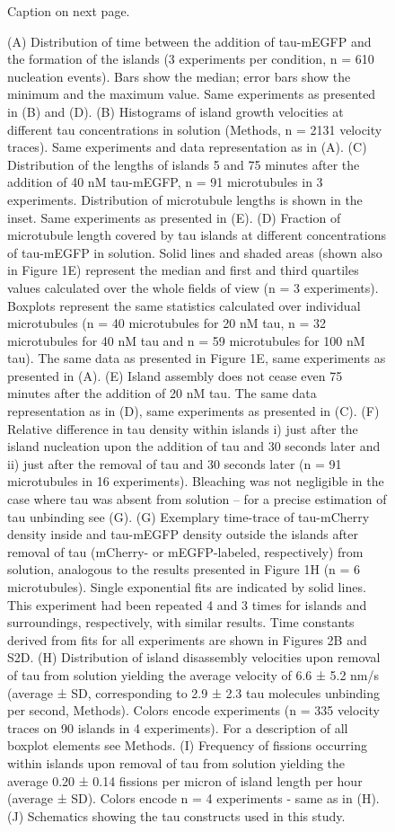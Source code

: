 \begin{figure}[h!tb]
\centering
\caption[Supplementary figure for: Tau on microtubules separates into two kinetically distinct phases.]{
Caption on next page.
	}\label{tau_s1}
\end{figure}
\begin{figure}[t]
  \caption{
 (A) Distribution of time between the addition of tau-mEGFP and the formation of the islands (3 experiments per condition, n = 610 nucleation events). Bars show the median; error bars show the minimum and the maximum value. Same experiments as presented in (B) and (D). (B) Histograms of island growth velocities at different tau concentrations in solution (Methods, n = 2131 velocity traces). Same experiments and data representation as in (A). (C) Distribution of the lengths of islands 5 and 75 minutes after the addition of 40 nM tau-mEGFP, n = 91 microtubules in 3 experiments. Distribution of microtubule lengths is shown in the inset. Same experiments as presented in (E). (D) Fraction of microtubule length covered by tau islands at different concentrations of tau-mEGFP in solution. Solid lines and shaded areas (shown also in Figure 1E) represent the median and first and third quartiles values calculated over the whole fields of view (n = 3 experiments). Boxplots represent the same statistics calculated over individual microtubules (n = 40 microtubules for 20 nM tau, n = 32 microtubules for 40 nM tau and n = 59 microtubules for 100 nM tau). The same data as presented in Figure 1E, same experiments as presented in (A). (E) Island assembly does not cease even 75 minutes after the addition of 20 nM tau. The same data representation as in (D), same experiments as presented in (C). (F) Relative difference in tau density within islands i) just after the island nucleation upon the addition of tau and 30 seconds later and ii) just after the removal of tau and 30 seconds later (n = 91 microtubules in 16 experiments). Bleaching was not negligible in the case where tau was absent from solution – for a precise estimation of tau unbinding see (G). (G) Exemplary time-trace of tau-mCherry density inside and tau-mEGFP density outside the islands after removal of tau (mCherry- or mEGFP-labeled, respectively) from solution, analogous to the results presented in Figure 1H (n = 6 microtubules). Single exponential fits are indicated by solid lines. This experiment had been repeated 4 and 3 times for islands and surroundings, respectively, with similar results. Time constants derived from fits for all experiments are shown in Figures 2B and S2D. (H) Distribution of island disassembly velocities upon removal of tau from solution yielding the average velocity of 6.6 ± 5.2 nm/s (average ± SD, corresponding to 2.9 ± 2.3 tau molecules unbinding per second, Methods). Colors encode experiments (n = 335 velocity traces on 90 islands in 4 experiments). For a description of all boxplot elements see Methods. (I) Frequency of fissions occurring within islands upon removal of tau from solution yielding the average 0.20 ± 0.14 fissions per micron of island length per hour (average ± SD). Colors encode n = 4 experiments - same as in (H). (J) Schematics showing the tau constructs used in this study.
  }
\end{figure}
